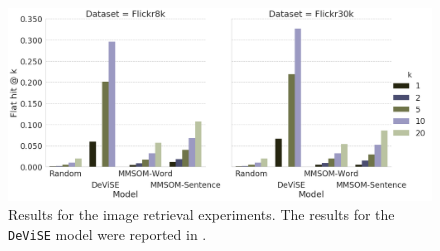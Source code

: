 \documentclass[a4paper]{standalone}
\begin{document}
\begin{figure}[h]
    \centering
    \includegraphics[width=\textwidth]{images/image_retrieval_results.png}
    \caption{Results for the image retrieval experiments. The results for the \texttt{DeViSE} model were reported in \cite{karpathy2014deep}.}
    \label{fig:ImageRetrievalResults}
\end{figure}
\end{document}
